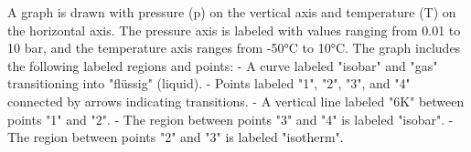 A graph is drawn with pressure (p) on the vertical axis and temperature (T) on the horizontal axis. The pressure axis is labeled with values ranging from 0.01 to 10 bar, and the temperature axis ranges from -50°C to 10°C. The graph includes the following labeled regions and points:  
- A curve labeled "isobar" and "gas" transitioning into "flüssig" (liquid).  
- Points labeled "1", "2", "3", and "4" connected by arrows indicating transitions.  
- A vertical line labeled "6K" between points "1" and "2".  
- The region between points "3" and "4" is labeled "isobar".  
- The region between points "2" and "3" is labeled "isotherm".